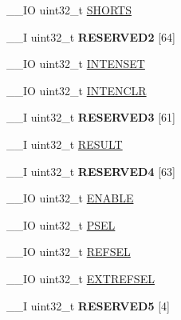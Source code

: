 \begin{DoxyCompactItemize}
\item 
\+\_\+\+\_\+\+I\+O uint32\+\_\+t \hyperlink{struct_n_r_f___l_p_c_o_m_p___type_a210ef00212af56034b67db052b387056}{S\+H\+O\+R\+T\+S}
\item 
\hypertarget{struct_n_r_f___l_p_c_o_m_p___type_a8d360a0f12458c775a792993c5ef1178}{}\+\_\+\+\_\+\+I uint32\+\_\+t {\bfseries R\+E\+S\+E\+R\+V\+E\+D2} \mbox{[}64\mbox{]}\label{struct_n_r_f___l_p_c_o_m_p___type_a8d360a0f12458c775a792993c5ef1178}

\item 
\+\_\+\+\_\+\+I\+O uint32\+\_\+t \hyperlink{struct_n_r_f___l_p_c_o_m_p___type_afa2e0bf3fdc694b9d366a6ec84bddd42}{I\+N\+T\+E\+N\+S\+E\+T}
\item 
\+\_\+\+\_\+\+I\+O uint32\+\_\+t \hyperlink{struct_n_r_f___l_p_c_o_m_p___type_a2cff036de65efe91da3ec71e0aaf54e0}{I\+N\+T\+E\+N\+C\+L\+R}
\item 
\hypertarget{struct_n_r_f___l_p_c_o_m_p___type_a717bc301423c8fa045e75984d312b4c9}{}\+\_\+\+\_\+\+I uint32\+\_\+t {\bfseries R\+E\+S\+E\+R\+V\+E\+D3} \mbox{[}61\mbox{]}\label{struct_n_r_f___l_p_c_o_m_p___type_a717bc301423c8fa045e75984d312b4c9}

\item 
\+\_\+\+\_\+\+I uint32\+\_\+t \hyperlink{struct_n_r_f___l_p_c_o_m_p___type_a1583f20fa70def4db99ebd308d5aa412}{R\+E\+S\+U\+L\+T}
\item 
\hypertarget{struct_n_r_f___l_p_c_o_m_p___type_acf90114e56aff08d93b22826ced3eea9}{}\+\_\+\+\_\+\+I uint32\+\_\+t {\bfseries R\+E\+S\+E\+R\+V\+E\+D4} \mbox{[}63\mbox{]}\label{struct_n_r_f___l_p_c_o_m_p___type_acf90114e56aff08d93b22826ced3eea9}

\item 
\+\_\+\+\_\+\+I\+O uint32\+\_\+t \hyperlink{struct_n_r_f___l_p_c_o_m_p___type_abbe9510d193085731e99182b8bf736db}{E\+N\+A\+B\+L\+E}
\item 
\+\_\+\+\_\+\+I\+O uint32\+\_\+t \hyperlink{struct_n_r_f___l_p_c_o_m_p___type_a81508b95b778fd7fe9c4900eb1267145}{P\+S\+E\+L}
\item 
\+\_\+\+\_\+\+I\+O uint32\+\_\+t \hyperlink{struct_n_r_f___l_p_c_o_m_p___type_acb5db22c6fa141bcad66f26f358e01d6}{R\+E\+F\+S\+E\+L}
\item 
\+\_\+\+\_\+\+I\+O uint32\+\_\+t \hyperlink{struct_n_r_f___l_p_c_o_m_p___type_aa3a889b357589f54d5528c4700b95575}{E\+X\+T\+R\+E\+F\+S\+E\+L}
\item 
\hypertarget{struct_n_r_f___l_p_c_o_m_p___type_a207a2fb84f62881d8c53ed5f3024c0eb}{}\+\_\+\+\_\+\+I uint32\+\_\+t {\bfseries R\+E\+S\+E\+R\+V\+E\+D5} \mbox{[}4\mbox{]}\label{struct_n_r_f___l_p_c_o_m_p___type_a207a2fb84f62881d8c53ed5f3024c0eb}


\end{DoxyCompactItemize}
